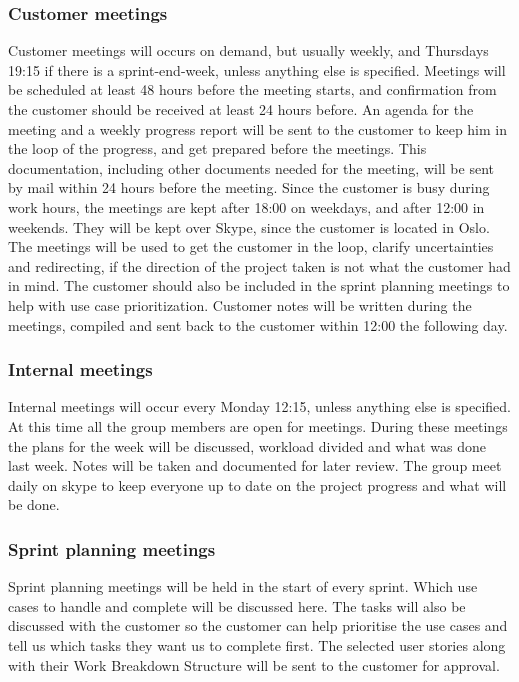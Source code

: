 \subsubsection{Customer meetings}
Customer meetings will occurs on demand, but usually weekly, and Thursdays 19:15 if there is a sprint-end-week, unless anything else is specified. Meetings will be scheduled at least 48 hours before the meeting starts, and confirmation from the customer should be received at least 24 hours before. An agenda for the meeting and a weekly progress report will be sent to the customer to keep him in the loop of the progress, and get prepared before the meetings. This documentation, including other documents needed for the meeting, will be sent by mail within 24 hours before the meeting. Since the customer is busy during work hours, the meetings are kept after 18:00 on weekdays, and after 12:00 in weekends. They will be kept over Skype, since the customer is located in Oslo. The meetings will be used to get the customer in the loop, clarify uncertainties and redirecting, if the direction of the project taken is not what the customer had in mind. The customer should also be included in the sprint planning meetings to help with use case prioritization. Customer notes will be written during the meetings, compiled and sent back to the customer within 12:00 the following day.

\subsubsection{Internal meetings}
Internal meetings will occur every Monday 12:15, unless anything else is specified. At this time all the group members are open for meetings. During these meetings the plans for the week will be discussed, workload divided and what was done last week. Notes will be taken and documented for later review. The group meet daily on skype to keep everyone up to date on the project progress and what will be done.

\subsubsection{Sprint planning meetings}
Sprint planning meetings will be held in the start of every sprint. Which use cases to handle and complete will be discussed here. The tasks will also be discussed with the customer so the customer can help prioritise the use cases and tell us which tasks they want us to complete first. The selected user stories along with their Work Breakdown Structure will be sent to the customer for approval.

